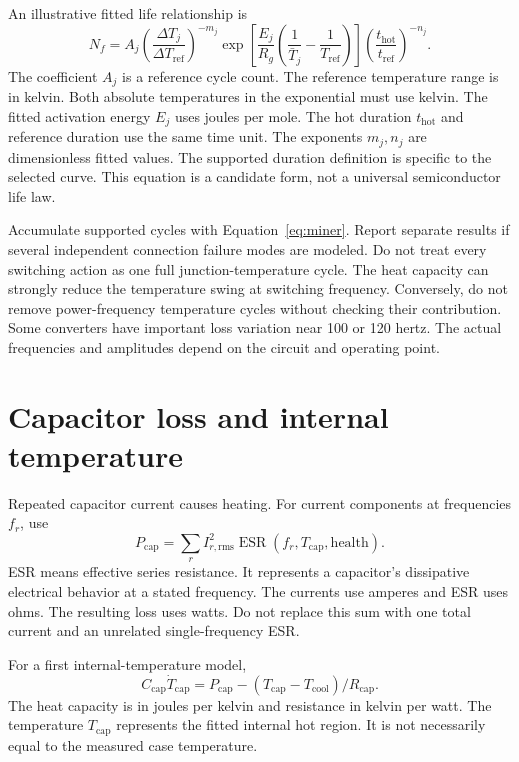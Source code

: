 \documentclass[11pt,a4paper]{report}
\begin{document}
An illustrative fitted life relationship is
\begin{equation}
N_f=A_j\left(\frac{\Delta T_j}{\Delta T_{\mathrm{ref}}}\right)^{-m_j}
\exp\!\left[\frac{E_j}{R_g}
\left(\frac{1}{\bar T_j}-\frac{1}{T_{\mathrm{ref}}}\right)\right]
\left(\frac{t_{\mathrm{hot}}}{t_{\mathrm{ref}}}\right)^{-n_j}.
\end{equation}
The coefficient $A_j$ is a reference cycle count.
The reference temperature range is in kelvin.
Both absolute temperatures in the exponential must use kelvin.
The fitted activation energy $E_j$ uses joules per mole.
The hot duration $t_{\mathrm{hot}}$ and reference duration use the same time unit.
The exponents $m_j,n_j$ are dimensionless fitted values.
The supported duration definition is specific to the selected curve.
This equation is a candidate form, not a universal semiconductor life law.

Accumulate supported cycles with Equation~\ref{eq:miner}.
Report separate results if several independent connection failure modes are modeled.
Do not treat every switching action as one full junction-temperature cycle.
The heat capacity can strongly reduce the temperature swing at switching frequency.
Conversely, do not remove power-frequency temperature cycles without checking their contribution.
Some converters have important loss variation near 100 or 120 hertz.
The actual frequencies and amplitudes depend on the circuit and operating point.

\section{Capacitor loss and internal temperature}
Repeated capacitor current causes heating.
For current components at frequencies $f_r$, use
\begin{equation}
P_{\mathrm{cap}}=\sum_r I_{r,\mathrm{rms}}^2
\operatorname{ESR}(f_r,T_{\mathrm{cap}},\mathrm{health}).
\end{equation}
ESR means effective series resistance.
It represents a capacitor's dissipative electrical behavior at a stated frequency.
The currents use amperes and ESR uses ohms.
The resulting loss uses watts.
Do not replace this sum with one total current and an unrelated single-frequency ESR.

For a first internal-temperature model,
\begin{equation}
C_{\mathrm{cap}}\dot T_{\mathrm{cap}}=
P_{\mathrm{cap}}-(T_{\mathrm{cap}}-T_{\mathrm{cool}})/R_{\mathrm{cap}}.
\end{equation}
The heat capacity is in joules per kelvin and resistance in kelvin per watt.
The temperature $T_{\mathrm{cap}}$ represents the fitted internal hot region.
It is not necessarily equal to the measured case temperature.
\end{document}
